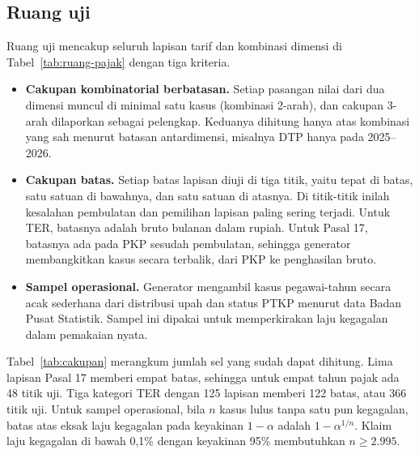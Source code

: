 

\subsection{Ruang uji}
\label{subsec:ruanguji}

Ruang uji mencakup seluruh lapisan tarif dan kombinasi dimensi di Tabel~\ref{tab:ruang-pajak} dengan tiga kriteria.
\begin{itemize}[leftmargin=*,nosep]
  \item \textbf{Cakupan kombinatorial berbatasan.} Setiap pasangan nilai dari dua dimensi muncul di minimal satu kasus (kombinasi 2-arah), dan cakupan 3-arah dilaporkan sebagai pelengkap. Keduanya dihitung hanya atas kombinasi yang sah menurut batasan antardimensi, misalnya DTP hanya pada 2025--2026.
  \item \textbf{Cakupan batas.} Setiap batas lapisan diuji di tiga titik, yaitu tepat di batas, satu satuan di bawahnya, dan satu satuan di atasnya. Di titik-titik inilah kesalahan pembulatan dan pemilihan lapisan paling sering terjadi. Untuk TER, batasnya adalah bruto bulanan dalam rupiah. Untuk Pasal 17, batasnya ada pada PKP sesudah pembulatan, sehingga generator membangkitkan kasus secara terbalik, dari PKP ke penghasilan bruto.
  \item \textbf{Sampel operasional.} Generator mengambil kasus pegawai-tahun secara acak sederhana dari distribusi upah dan status PTKP menurut data Badan Pusat Statistik. Sampel ini dipakai untuk memperkirakan laju kegagalan dalam pemakaian nyata.
\end{itemize}

Tabel~\ref{tab:cakupan} merangkum jumlah sel yang sudah dapat dihitung. Lima lapisan Pasal 17 memberi empat batas, sehingga untuk empat tahun pajak ada 48 titik uji. Tiga kategori TER dengan 125 lapisan memberi 122 batas, atau 366 titik uji. Untuk sampel operasional, bila $n$ kasus lulus tanpa satu pun kegagalan, batas atas eksak laju kegagalan pada keyakinan $1-\alpha$ adalah $1 - \alpha^{1/n}$. Klaim laju kegagalan di bawah 0,1\% dengan keyakinan 95\% membutuhkan $n \ge 2.995$.

